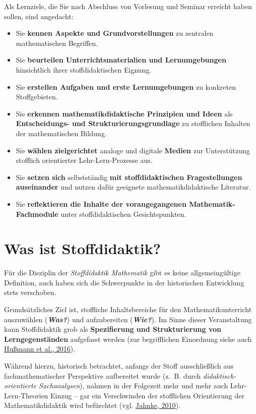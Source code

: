 \documentclass[
  ngerman,
]{scrbook}
\providecommand{\tightlist}{%
  \setlength{\itemsep}{0pt}\setlength{\parskip}{0pt}}
\theoremstyle{definition}
\theoremstyle{definition}
\theoremstyle{definition}
\theoremstyle{definition}
\theoremstyle{remark}
\begin{document}
Als Lernziele, die Sie nach Abschluss von Vorlesung und Seminar erreicht haben sollen, sind angedacht:

\begin{itemize}
\tightlist
\item
  Sie \textbf{kennen Aspekte und Grundvorstellungen} zu zentralen mathematischen Begriffen.
\item
  Sie \textbf{beurteilen Unterrichtsmaterialien und Lernumgebungen} hinsichtlich ihrer stoffdidaktischen Eignung.
\item
  Sie \textbf{erstellen Aufgaben und erste Lernumgebungen} zu konkreten Stoffgebieten.
\item
  Sie \textbf{erkennen mathematikdidaktische Prinzipien und Ideen} als \textbf{Entscheidungs- und Strukturierungsgrundlage} zu stofflichen Inhalten der mathematischen Bildung.
\item
  Sie \textbf{wählen zielgerichtet} analoge und digitale \textbf{Medien} zur Unterstützung stofflich orientierter Lehr-Lern-Prozesse aus.
\item
  Sie \textbf{setzen sich} selbstständig \textbf{mit stoffdidaktischen Fragestellungen auseinander} und nutzen dafür geeignete mathematikdidaktische Literatur.
\item
  Sie \textbf{reflektieren die Inhalte der vorangegangenen Mathematik-Fachmodule} unter stoffdidaktischen Gesichtspunkten.
\end{itemize}

\hypertarget{was-ist-stoffdidaktik}{%
\section{Was ist Stoffdidaktik?}\label{was-ist-stoffdidaktik}}

Für die Disziplin der \emph{Stoffdidaktik Mathematik} gibt es keine allgemeingültige Definition, auch haben sich die Schwerpunkte in der historischen Entwicklung stets verschoben.

Grundsätzliches Ziel ist, stoffliche Inhaltsbereiche für den Mathematikunterricht auszuwählen (\textbf{\emph{Was?}}) und aufzubereiten (\textbf{\emph{Wie?}}). Im Sinne dieser Veranstaltung kann Stoffdidaktik grob als \textbf{Spezifierung und Strukturierung von Lerngegenständen} aufgefasst werden (zur begrifflichen Einordnung siehe auch \protect\hyperlink{ref-Hussmann:2016a}{Hußmann et al., 2016}).

Während hierzu, historisch betrachtet, anfangs der Stoff ausschließlich aus fachmathematischer Perspektive aufbereitet wurde (z.~B. durch \emph{didaktisch-orientierte Sachanalysen}), nahmen in der Folgezeit mehr und mehr auch Lehr-Lern-Theorien Einzug -- gar ein Verschwinden der stofflichen Orientierung der Mathematikdidaktik wird befürchtet (vgl. \protect\hyperlink{ref-Jahnke:2010}{Jahnke, 2010}).
\end{document}
